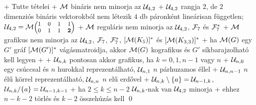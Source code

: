 + \thm Tutte tételei
  + $\mathcal{M}$ bináris \LRA nem minorja az $\mathcal{U}_{4, 2}$
    + $\mathcal{U}_{4, 2}$ rangja $2$, de $2$ dimenziós bináris vektorokból
      nem létezik $4$ db páronként lineárisan független;
      $\mathcal{U}_{4, 2} = \mathcal{M} \text{\footnotesize$\begin{pmatrix}
          1 & 0 & 1 & 1 \\
          0 & 1 & 1 & \mathbf{2}
        \end{pmatrix}$}$
  + $\mathcal{M}$ reguláris \LRA nem minorja az $\mathcal{U}_{4, 2}$,
  $\mathcal{F}_7$ és $\mathcal{F}_7^*$
  + $\mathcal{M}$ grafikus \LRA nem minorja az $\mathcal{U}_{4, 2}$,
    $\mathcal{F}_7$, ${\mathcal{F}_7^*}$, ${[\mathcal{M}(K_5)]^*}$ és ${[\mathcal{M}(K_{3, 3})]^*}$
    + ha $\mathcal{M}(G)$ egy $G'$ gráf $[\mathcal{M}(G')]^*$ vágásmatroidja, akkor
      $\mathcal{M}(G)$ kografikus és $G'$ síkbarajzolható kell legyen
  + \noproof
+ \thm $\mathcal{U}_{n, k}$ pontosan akkor grafikus, ha $k = 0, 1, n - 1$ vagy
  $n$
  + \proof $\mathcal{U}_{n, 0}$ egy csúccsal és $n$ hurokkal reprezentálható,
    $\mathcal{U}_{n, 1}$ $n$ párhuzamos éllel
  + $\mathcal{U}_{n, n - 1}$ $n$ élű körrel reprezentálható, $\mathcal{U}_{n, n}$ $n$
    elű erdővel
  + $\mathcal{U}_{n, k} \setminus \{a\} = \mathcal{U}_{n - 1, k}$, $\mathcal{U}_{n, k} / \{a\}
    = \mathcal{U}_{n - 1, k - 1}$
    + ha $2 \le k \le n - 2$ \RA $\mathcal{U}_{n, k}$-nak van $\mathcal{U}_{4, 2}$
      minorja
    + ehhez $n - k - 2$ törlés és $k - 2$ összehúzás kell \qed


